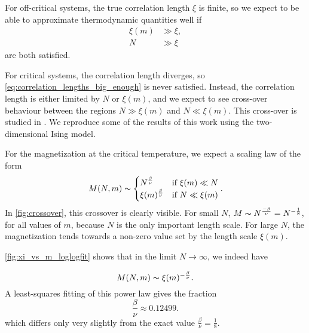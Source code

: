 
For off-critical systems, the true correlation length $\xi$ is finite, so we expect to be
able to approximate thermodynamic quantities well if
\begin{equation}\label{eq:correlation_lengths_big_enough}
\begin{aligned}
\xi(m) & \gg \xi, \\
N & \gg \xi
\end{aligned}
\end{equation}
are both satisfied.

For critical systems, the correlation length diverges, so
\autoref{eq:correlation_lengths_big_enough} is never satisfied. Instead, the correlation
length is either limited by $N$ or $\xi(m)$, and we expect to see cross-over behaviour
between the regions $N \gg \xi(m)$ and $N \ll \xi(m)$. This cross-over is studied in
\cite{nishino1996numerical}. We reproduce some of the results of this work using the
two-dimensional Ising model.

For the magnetization at the critical temperature, we expect a scaling law of the form
\begin{equation}
  M(N, m) \thicksim
  \begin{cases}
    N^{\frac{\beta}{\nu}} &\text{if } \xi(m) \ll N \\
    \xi(m)^{\frac{\beta}{\nu}} &\text{if } N \ll \xi(m)
  \end{cases}.
\end{equation}
In \autoref{fig:crossover}, this crossover is clearly visible. For small $N$, $M \thicksim
N^{\frac{-\beta}{\nu}} = N^{-\frac{1}{8}}$, for all values of $m$, because $N$ is the only
important length scale. For large $N$, the magnetization tends towards a non-zero value
set by the length scale $\xi(m)$.

\autoref{fig:xi_vs_m_loglogfit} shows that in the limit $N \to
\infty$, we indeed have

\begin{equation}
  M(N, m) \thicksim \xi(m)^{-\frac{\beta}{\nu}}.
\end{equation}
A least-squares fitting of this power law gives the fraction
\begin{equation}
\frac{\beta}{\nu} \approx 0.12499.
\end{equation}
which differs only very slightly from the exact value $\frac{\beta}{\nu} = \frac{1}{8}$.

